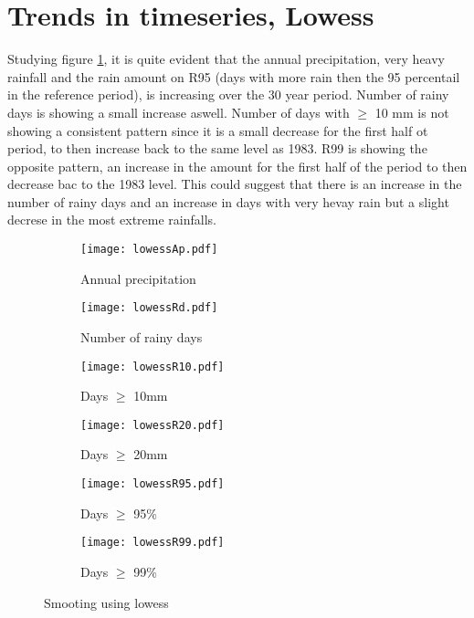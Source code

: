 \documentclass{article}
\begin{document}
	\section{Trends in timeseries, Lowess}
	Studying figure \ref{lowess}, it is quite evident that the annual precipitation, very heavy rainfall and the rain amount on R95 (days with more rain then the 95 percentail in the reference period), is increasing over the 30 year period. Number of rainy days is showing a small increase aswell. Number of days with $\geq$ 10 mm is not showing a consistent pattern since it is a small decrease for the first half ot period, to then increase back to the same level as 1983. R99 is showing the opposite pattern, an increase in the amount for the first half of the period to then decrease bac to the 1983 level. 
	This could suggest that there is an increase in the number of rainy days and an increase in days with very hevay rain but a slight decrese in the most extreme rainfalls. 
	\begin{figure}[H]
		\centering
		\begin{subfigure}{0.5\textwidth}
			\centering
			\texttt{[image: lowessAp.pdf]}
			\caption{Annual precipitation}
	\end{subfigure}%
	\begin{subfigure}{0.5\textwidth}
		\centering
		\texttt{[image: lowessRd.pdf]}
		\caption{Number of rainy days}
	\end{subfigure}	
	\begin{subfigure}{0.5\textwidth}
		\centering
		\texttt{[image: lowessR10.pdf]}
		\caption{Days $\geq$ 10mm}
	\end{subfigure}%
	\begin{subfigure}{0.5\textwidth}
		\centering
		\texttt{[image: lowessR20.pdf]}
		\caption{Days $\geq$ 20mm}
	\end{subfigure}
	\begin{subfigure}{0.5\textwidth}
		\centering
		\texttt{[image: lowessR95.pdf]}
		\caption{Days $\geq$ 95\%}
	\end{subfigure}%
	\begin{subfigure}{0.5\textwidth}
		\centering
		\texttt{[image: lowessR99.pdf]}
		\caption{Days $\geq$ 99\%}
	\end{subfigure}
	\caption{Smooting using lowess}
	\label{lowess}
	\end{figure}
	
\end{document}
